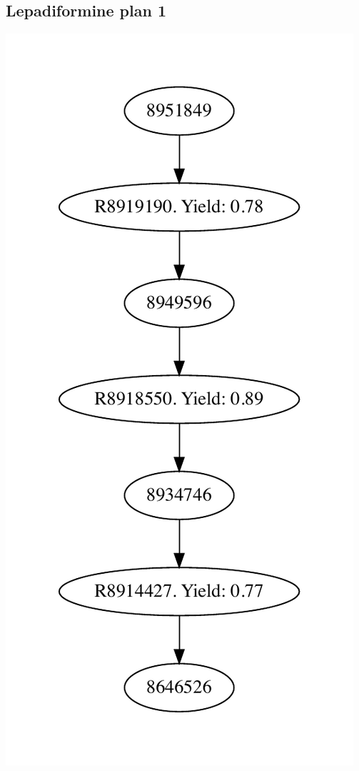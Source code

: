 \documentclass[a4paper,10pt,titlepage]{paper}
\begin{document}
\subsection{Lepadiformine plan 1}
\centering
\includegraphics[scale=0.4]{Synteseplaner/Lepadiformine/plan1.pdf}
\label{Appendix::Lepadiformine1}
\end{document}
